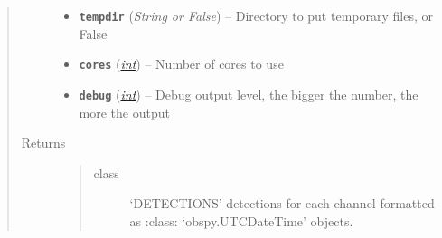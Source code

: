 \documentclass[a4paper,10pt,english]{sphinxmanual}
\begin{document}
\begin{fulllineitems}
\begin{quote}
\begin{description}
\begin{itemize}
\item {} 
\textbf{\texttt{tempdir}} (\emph{String or False}) -- Directory to put temporary files, or False

\item {} 
\textbf{\texttt{cores}} (\href{https://docs.python.org/library/functions.html\#int}{\emph{int}}) -- Number of cores to use

\item {} 
\textbf{\texttt{debug}} (\href{https://docs.python.org/library/functions.html\#int}{\emph{int}}) -- Debug output level, the bigger the number, the more the output

\end{itemize}

\item[{Returns}] \leavevmode
\begin{quote}\begin{description}
\item[{class}] \leavevmode
`DETECTIONS' detections for each channel formatted as    :class: `obspy.UTCDateTime' objects.

\end{description}\end{quote}


\end{description}\end{quote}

\end{fulllineitems}

\end{document}
